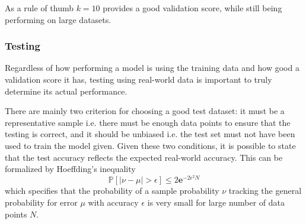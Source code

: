 As a rule of thumb $k=10$ provides a good validation score, while still being performing on large datasets\cite{learningfromdata2012course}.

\subsubsection{Testing}
\label{ssub:Testing}
Regardless of how performing a model is using the training data and how good a validation score it has,
testing using real-world data is important to truly determine its actual performance.

There are mainly two criterion for choosing a good test dataset: it must be a representative sample i.e. there must be enough data points to ensure that the testing is correct,
and it should be unbiased i.e. the test set must not have been used to train the model given.
Given these two conditions, it is possible to state that the test accuracy reflects the expected real-world accuracy.
This can be formalized by Hoeffding's inequality
$$\mathbb{P}\left[\left|\nu - \mu\right|> \epsilon\right]\leq 2\mathbf{e}^{-2\epsilon^2N}$$
which specifies that the probability of a sample probability $\nu$ tracking the general probability for error $\mu$ with accuracy $\epsilon$ is very small for large
number of data points $N$.
